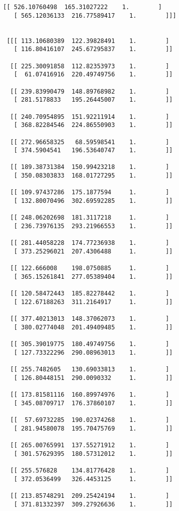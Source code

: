 \documentclass[11pt]{article}
\begin{document}
\begin{Verbatim}[commandchars=\\\{\}]
  [[ 526.10760498  165.31027222    1.        ]
   [ 565.12036133  216.77589417    1.        ]]]


 [[[ 113.10680389  122.39828491    1.        ]
   [ 116.80416107  245.67295837    1.        ]]

  [[ 225.30091858  112.82353973    1.        ]
   [  61.07416916  220.49749756    1.        ]]

  [[ 239.83990479  148.89768982    1.        ]
   [ 281.5178833   195.26445007    1.        ]]

  [[ 240.70954895  151.92211914    1.        ]
   [ 368.82284546  224.86550903    1.        ]]

  [[ 272.96658325   68.59598541    1.        ]
   [ 374.5904541   196.53640747    1.        ]]

  [[ 189.38731384  150.99423218    1.        ]
   [ 350.08303833  168.01727295    1.        ]]

  [[ 109.97437286  175.1877594     1.        ]
   [ 132.80070496  302.69592285    1.        ]]

  [[ 248.06202698  181.3117218     1.        ]
   [ 236.73976135  293.21966553    1.        ]]

  [[ 281.44058228  174.77236938    1.        ]
   [ 373.25296021  207.4306488     1.        ]]

  [[ 122.666008    198.0750885     1.        ]
   [ 365.15261841  277.05389404    1.        ]]

  [[ 120.58472443  185.82278442    1.        ]
   [ 122.67188263  311.2164917     1.        ]]

  [[ 377.40213013  148.37062073    1.        ]
   [ 380.02774048  201.49409485    1.        ]]

  [[ 305.39019775  180.49749756    1.        ]
   [ 127.73322296  290.08963013    1.        ]]

  [[ 255.7482605   130.69033813    1.        ]
   [ 126.80448151  290.0090332     1.        ]]

  [[ 173.81581116  160.89974976    1.        ]
   [ 345.08709717  176.37860107    1.        ]]

  [[  57.69732285  190.02374268    1.        ]
   [ 281.94580078  195.70475769    1.        ]]

  [[ 265.00765991  137.55271912    1.        ]
   [ 301.57629395  180.57312012    1.        ]]

  [[ 255.576828    134.81776428    1.        ]
   [ 372.0536499   326.4453125     1.        ]]

  [[ 213.85748291  209.25424194    1.        ]
   [ 371.81332397  309.27926636    1.        ]]


\end{Verbatim}
\end{document}
